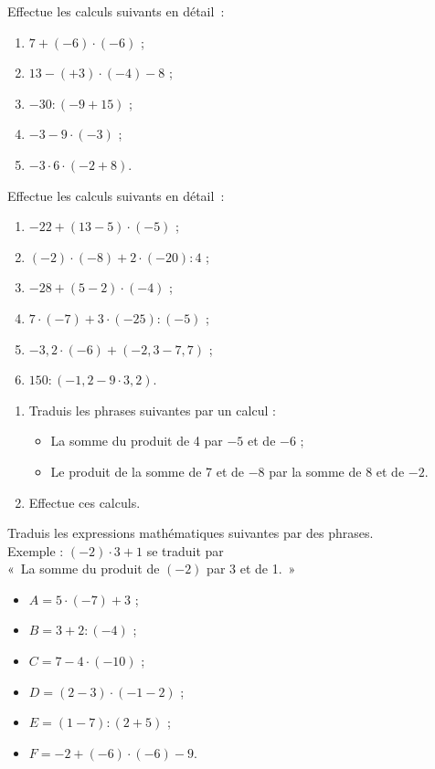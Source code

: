 \begin{exercice}
Effectue les calculs suivants en détail :
\begin{enumerate}
 \item $7 + (-6) \cdot (-6)$ ;
 \item $13 - (+3) \cdot (-4) - 8$ ;
 \item $-30 : (-9 + 15)$ ;
 \item $-3 -9 \cdot (-3)$ ;
 \item $-3 \cdot 6 \cdot (-2 + 8)$.
 \end{enumerate}
\end{exercice}


\begin{exercice}
Effectue les calculs suivants en détail :
\begin{enumerate}
 \item $-22 + (13 - 5) \cdot (-5)$ ;
 \item $(-2) \cdot (-8) + 2 \cdot (-20) : 4$ ;
 \item $-28 + (5 - 2) \cdot (-4)$ ;
 \item $7 \cdot (-7) + 3 \cdot (-25) : (-5)$ ;
 \item $-3,2 \cdot (-6) + (-2,3 - 7,7)$ ;
 \item $150 : (-1,2 - 9 \cdot 3,2)$.
 \end{enumerate}
\end{exercice}


\begin{exercice}[Vocabulaire]
\begin{enumerate}
 \item Traduis les phrases suivantes par un calcul :
 \begin{itemize}
  \item \textcolor{A1}{La somme du produit de 4 par $-5$ et de $-6$ ;}
  \item \textcolor{H1}{Le produit de la somme de 7 et de $-8$ par la somme de 8 et de $-2$.}
  \end{itemize}  
 \item Effectue ces calculs.
 \end{enumerate}
\end{exercice}


\begin{exercice}
Traduis les expressions mathématiques suivantes par des phrases. \\[0.5em]
Exemple : $(-2) \cdot 3 + 1$ se traduit par \\[0.5em]
« \textcolor{A1}{La somme du produit de $(-2)$ par 3 et de 1.} »\\[0.5em]
\begin{itemize}
 \item $A = 5 \cdot (-7) + 3$ ;
 \item $B = 3 + 2 : (-4)$ ;
 \item $C = 7 - 4 \cdot (-10)$ ;
 \item $D = (2 - 3) \cdot (-1 - 2)$ ;
 \item $E = (1 - 7) : (2 + 5)$ ;
 \item $F = -2 +(-6) \cdot (-6) - 9$.
 \end{itemize}
\end{exercice}


